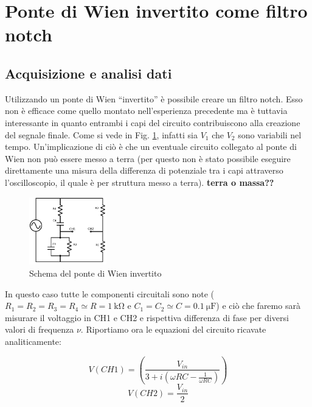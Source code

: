 \section{Ponte di Wien invertito come filtro notch}
\subsection{Acquisizione e analisi dati}
Utilizzando un ponte di Wien ``invertito'' è possibile creare un filtro notch. Esso non è efficace come quello montato nell'esperienza precedente ma è tuttavia interessante in quanto entrambi i capi del circuito contribuiscono alla creazione del segnale finale. Come si vede in Fig. \ref{fig:Winv}, infatti sia $V_1$ che $V_2$ sono variabili nel tempo. Un'implicazione di ciò è che un eventuale circuito collegato al ponte di Wien non può essere messo a terra (per questo non è stato possibile eseguire direttamente una misura della differenza di potenziale tra i capi attraverso l'oscilloscopio, il quale è per struttura messo a terra). \textbf{terra o massa??}
%
\begin{figure}
	\centering
    \includegraphics[width=0.30\textwidth]{schema2.pdf}
    \caption{Schema del ponte di Wien invertito}
    \label{fig:Winv}
\end{figure}

In questo caso tutte le componenti circuitali sono note ($R_1 = R_2 = R_3 = R_4 \simeq R = \SI{1}{\kilo\ohm}$ e $C_1 = C_2 \simeq C = \SI{0.1}{\micro\farad}$) e ciò che faremo sarà misurare il voltaggio in CH1 e CH2 e rispettiva differenza di fase per diversi valori di frequenza $\nu$. Riportiamo ora le equazioni del circuito ricavate analiticamente: 

\noindent
\begin{equation}
V(CH1) = (\frac{V_{in}}{3+i(\omega R C - \frac{1}{\omega R C})})
\label{eq:V1}
\end{equation}
\begin{equation}
V(CH2) = \frac{V_{in}}{2}
\label{eq:V(CH2)}
\end{equation}


